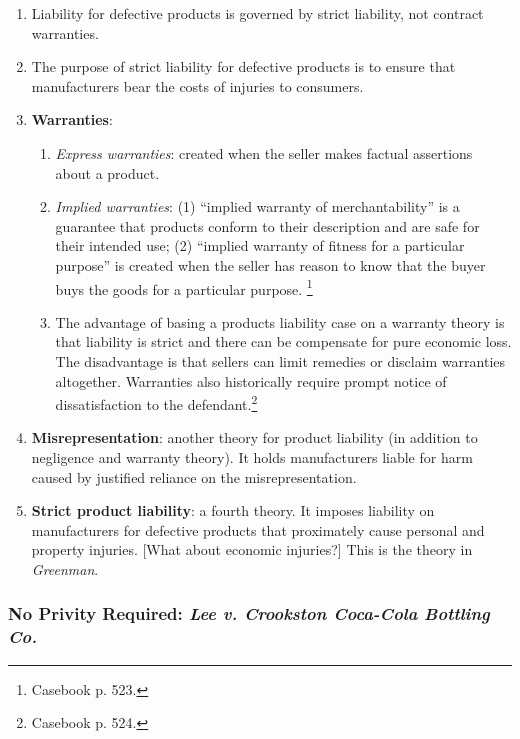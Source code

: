 \begin{enumerate}
{    strictly liable in tort when an article he places on the market, knowing 
    that it is to be used without inspection for defects, proves to have a 
    defect that causes injury to a human being.''}\footnote{Casebook p. 521.}
    \item Liability for defective products is governed by strict liability, not 
    contract warranties.  \item The purpose of strict liability for defective 
    products is to ensure that manufacturers bear the costs of injuries to 
    consumers.
    \item \textbf{Warranties}:
    \begin{enumerate}
        \item \emph{Express warranties}: created when the seller makes factual 
        assertions about a product.
        \item \emph{Implied warranties}: (1) ``implied warranty of 
        merchantability'' is a guarantee that products conform to their 
        description and are safe for their intended use; (2) ``implied warranty 
        of fitness for a particular purpose'' is created when the seller has 
        reason to know that the buyer buys the goods for a particular purpose. 
        \footnote{Casebook p. 523.}
        \item The advantage of basing a products liability case on a warranty 
        theory is that liability is strict and there can be compensate for pure 
        economic loss. The disadvantage is that sellers can limit remedies or 
        disclaim warranties altogether. Warranties also historically require 
        prompt notice of dissatisfaction to the defendant.\footnote{Casebook p. 
        524.}
    \end{enumerate}
    \item \textbf{Misrepresentation}: another theory for product liability (in 
    addition to negligence and warranty theory). It holds manufacturers liable 
    for harm caused by justified reliance on the misrepresentation.
    \item \textbf{Strict product liability}: a fourth theory. It imposes 
    liability on manufacturers for defective products that proximately cause 
    personal and property injuries. [What about economic injuries?] This is the 
    theory in \emph{Greenman}.
\end{enumerate}

\subsubsection{No Privity Required: \emph{Lee v. Crookston Coca-Cola Bottling 
Co.}}

